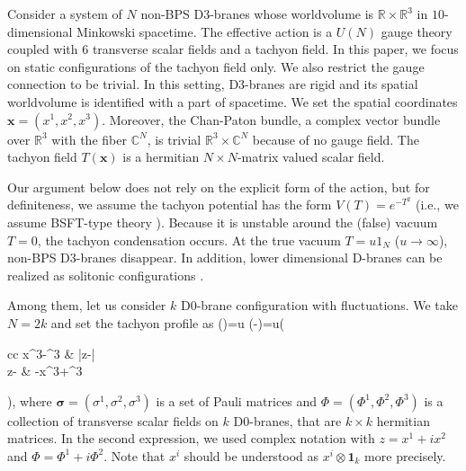 \documentclass[12pt]{article}
\numberwithin{equation}{section}
\def\mat#1{\matt[#1]}
\def\matt[#1,#2,#3,#4]{\left(%
\begin{array}{cc} #1 & #2 \\ #3 & #4 \end{array} \right)}
\def\real{\mathbb{R}}
\def\complex{\mathbb{C}}
\def\bea#1\ena{\begin{align}#1\end{align}}
\begin{document}
Consider a system of $N$ non-BPS D3-branes whose worldvolume is $\real\times \real^3$ in $10$-dimensional 
Minkowski spacetime.
The effective action is a $U(N)$ gauge theory 
coupled with $6$ transverse scalar fields and a tachyon field.
In this paper, we focus on static configurations of the tachyon field only.
{We also restrict the gauge connection to be trivial.}
In this setting, 
D3-branes are rigid 
and its spatial worldvolume is identified with a part of spacetime.
We set the spatial coordinates $\boldsymbol{x}=(x^1,x^2,x^3)$.
Moreover, the Chan-Paton bundle, 
a complex vector bundle over $\real^3$ with the fiber $\complex^{N}$, 
is trivial $\real^3 \times \complex^{N}$ because of no gauge field.
The tachyon field $T(\boldsymbol{x})$ is a hermitian $N\times N$-matrix valued scalar field.

Our argument below does not rely on the explicit form of the action, but for definiteness,
we assume the tachyon potential has the form $V(T)=e^{-T^2}$ 
 (i.e., we assume BSFT-type theory \cite{Takayanagi2000,Kraus2001}).
Because it is unstable around the (false) vacuum $T=0$, the tachyon condensation occurs.
At the true vacuum $T=u 1_N$ ($u\to \infty$), non-BPS D3-branes disappear.
In addition, lower dimensional D-branes can be realized as solitonic configurations
\cite{Sen1998}. 

Among them, let us consider $k$ D0-brane configuration with fluctuations.
We take $N=2k$ and set the tachyon profile as  
\bea
T()=u \boldsymbol{\sigma} \cdot (-\Phi)=u\mat{x^3-\Phi^3,\bar{z}-\bar{\Phi},z-\Phi,-x^3+\Phi^3},
\label{generic tachyon}
\ena
where
$\boldsymbol{\sigma}=(\sigma^1,\sigma^2,\sigma^3)$ is a set of Pauli matrices
and $\Phi=(\Phi^1,\Phi^2,\Phi^3)$ is a collection of transverse scalar fields on $k$ D0-branes,
that are $k\times k$ hermitian matrices.
In the second expression, we used complex notation with 
$z=x^1+ix^2$ and $\Phi=\Phi^1+i\Phi^2$.
Note that $x^i$ should be understood as $x^i \otimes \mathbf{1}_k$ more precisely.
\end{document}
